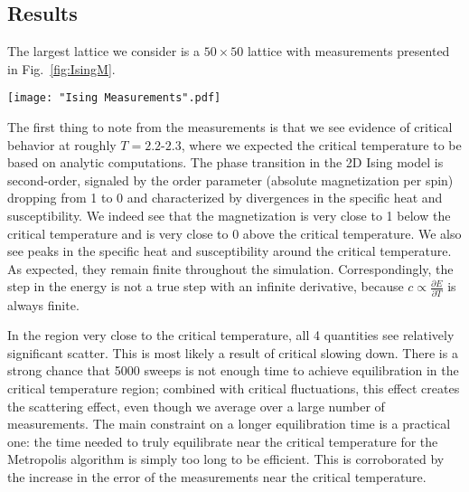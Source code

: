 \documentclass[twocolumn,aps]{revtex4-1} %
\newcommand{\pd}{\partial}
\begin{document}
\subsection{Results}
The largest lattice we consider is a $50 \times 50$ lattice with measurements presented in Fig.~\ref{fig:IsingM}.
\begin{figure*}
	\texttt{[image: "Ising Measurements".pdf]}
	\caption{\label{fig:IsingM}Plots showing the mean energy per spin, specific heat per spin, mean (absolute) magnetization per spin, magnetic susceptibility for the Ising model on a 50 $\times$ 50 lattice from $T = 1.6$ to $T = 2.9$ in increments of $\Delta T = .01$. The lines overlaid on the data are lines of best-of-fit determined using \texttt{optimize.curve\_fit}. The equilibration time at each temperature is 5000 sweeps and each data point is obtained from 5000 measurements.}
\end{figure*}

The first thing to note from the measurements is that we see evidence of critical behavior at roughly $T = 2.2$-$2.3$, where we expected the critical temperature to be based on analytic computations. The phase transition in the 2D Ising model is second-order, signaled by the order parameter (absolute magnetization per spin) dropping from 1 to 0 and characterized by divergences in the specific heat and susceptibility. We indeed see that the magnetization is very close to 1 below the critical temperature and is very close to 0 above the critical temperature. We also see peaks in the specific heat and susceptibility around the critical temperature. As expected, they remain finite throughout the simulation. Correspondingly, the step in the energy is not a true step with an infinite derivative, because $c \propto \frac{\pd E}{\pd T}$ is always finite.

In the region very close to the critical temperature, all 4 quantities see relatively significant scatter. This is most likely a result of critical slowing down. There is a strong chance that 5000 sweeps is not enough time to achieve equilibration in the critical temperature region; combined with critical fluctuations, this effect creates the scattering effect, even though we average over a large number of measurements. The main constraint on a longer equilibration time is a practical one: the time needed to truly equilibrate near the critical temperature for the Metropolis algorithm is simply too long to be efficient. This is corroborated by the increase in the error of the measurements near the critical temperature.
\end{document}
